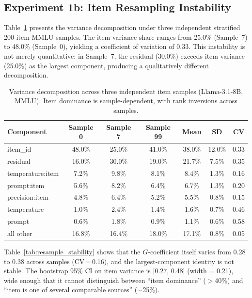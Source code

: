 \documentclass[11pt]{article}
\begin{document}
\subsection{Experiment 1b: Item Resampling Instability}
\label{sec:exp1b}

Table~\ref{tab:resample} presents the variance decomposition under three independent stratified 200-item MMLU samples.
The item variance share ranges from 25.0\% (Sample~7) to 48.0\% (Sample~0), yielding a coefficient of variation of 0.33.
This instability is not merely quantitative: in Sample~7, the residual (30.0\%) exceeds item variance (25.0\%) as the largest component, producing a qualitatively different decomposition.

\begin{table}[t]
\centering
\caption{Variance decomposition across three independent item samples (Llama-3.1-8B, MMLU). Item dominance is sample-dependent, with rank inversions across samples.}
\label{tab:resample}
\begin{tabular}{lcccccc}
\toprule
Component & Sample 0 & Sample 7 & Sample 99 & Mean & SD & CV \\
\midrule
item\_id        & 48.0\% & 25.0\% & 41.0\% & 38.0\% & 12.0\% & 0.33 \\
residual        & 16.0\% & 30.0\% & 19.0\% & 21.7\% & 7.5\%  & 0.35 \\
temperature:item& 7.2\%  & 9.8\%  & 8.1\%  & 8.4\%  & 1.3\%  & 0.16 \\
prompt:item     & 5.6\%  & 8.2\%  & 6.4\%  & 6.7\%  & 1.3\%  & 0.20 \\
precision:item  & 4.8\%  & 6.4\%  & 5.2\%  & 5.5\%  & 0.8\%  & 0.15 \\
temperature     & 1.0\%  & 2.4\%  & 1.4\%  & 1.6\%  & 0.7\%  & 0.46 \\
prompt          & 0.6\%  & 1.8\%  & 0.9\%  & 1.1\%  & 0.6\%  & 0.58 \\
all other       & 16.8\% & 16.4\% & 18.0\% & 17.1\% & 0.8\%  & 0.05 \\
\bottomrule
\end{tabular}
\end{table}

Table~\ref{tab:resample_stability} shows that the $G$-coefficient itself varies from 0.28 to 0.38 across samples (CV\,=\,0.16), and the largest-component identity is not stable.
The bootstrap 95\% CI on item variance is [0.27, 0.48] (width = 0.21), wide enough that it cannot distinguish between ``item dominance'' ($>$40\%) and ``item is one of several comparable sources'' ($\sim$25\%).
\end{document}
